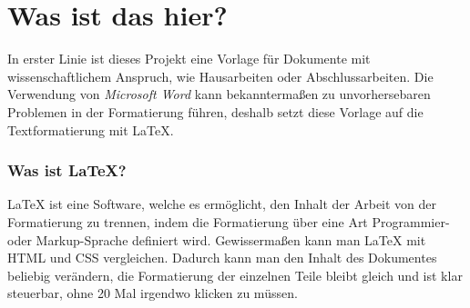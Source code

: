 \documentclass[12pt]{article}
\begin{document}
    \renewcommand{\mytitle}{Wissenschaftliches Arbeiten mit LaTeX\\Dokumentation}%
    \renewcommand{\myauthor}{Dr. Frank N. Further}%
    \renewcommand{\headheight}{27pt}%



    \frontmatter%


    \printabbreviations%
    \clearpage
    \renewcommand{\plaintitle}{Abbildungsverzeichnis}
    {\def\makebox[#1][#2]#3{#3}%
        \listoffigures
    }
    \clearpage
    \renewcommand{\plaintitle}{Tabellenverzeichnis}
    {\def\makebox[#1][#2]#3{#3}%
        \listoftables
    }
    \clearpage
    \renewcommand{\plaintitle}{Inhaltsverzeichnis}%
    {\def\makebox[#1][#2]#3{#3}%
        \tableofcontents
    }


    \clearpage
    \mainmatter%

	\part{Was ist das hier?}
	In erster Linie ist dieses Projekt eine Vorlage für Dokumente mit wissenschaftlichem Anspruch, wie Hausarbeiten oder Abschlussarbeiten. Die Verwendung von \textit{Microsoft Word} kann bekanntermaßen zu unvorhersebaren Problemen in der Formatierung führen, deshalb setzt diese Vorlage auf die Textformatierung mit LaTeX.
	\section{Was ist LaTeX?}
	LaTeX ist eine Software, welche es ermöglicht, den Inhalt der Arbeit von der Formatierung zu trennen, indem die Formatierung über eine Art Programmier- oder Markup-Sprache definiert wird. Gewissermaßen kann man LaTeX mit HTML und CSS vergleichen. Dadurch kann man den Inhalt des Dokumentes beliebig verändern, die Formatierung der einzelnen Teile bleibt gleich und ist klar steuerbar, ohne 20 Mal irgendwo klicken zu müssen.
\end{document}

